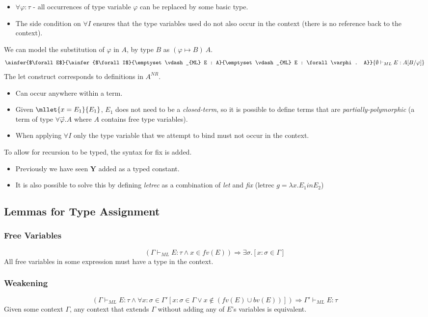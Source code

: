 \begin{itemize}
	\item $\forall \varphi : \tau$ - all occurrences of type variable $\varphi$ can be replaced by some basic type.
	\item The side condition on $\forall I$ ensures that the type variables used do not also occur in the context (there is no reference back to the context).
\end{itemize}
We can model the substitution of $\varphi$ in $A$, by type $B$ as $(\varphi \mapsto B) \ A$.
\[\ainfer{$\forall E$}{\ainfer{$\forall I$}{\emptyset \vdash_{ML} E : A}{\emptyset \vdash_{ML} E : \forall \varphi . A}}{\emptyset \vdash_{ML} E : A [B/\varphi]}\]
The let construct corresponds to definitions in $A^{NR}$.
\begin{itemize}
	\item Can occur anywhere within a term.
	\item Given $\mllet{x = E_1}{E_1}$, $E_1$ does not need to be a \textit{closed-term}, so it is possible to define terms that are \textit{partially-polymorphic} (a term of type $\forall \overset{\rightharpoonup}{\varphi} . A$ where $A$ contains free type variables).
	\item When applying $\forall I$ only the type variable that we attempt to bind must not occur in the context.
\end{itemize}
To allow for recursion to be typed, the syntax for fix is added.
\begin{itemize}
	\item Previously we have seen $\mathbf{Y}$ added as a typed constant.
	\item It is also possible to solve this by defining \textit{letrec} as a combination of \textit{let} and \textit{fix} ($\text{letrec } g = \lambda x . E_1 in E_2$)
\end{itemize}
\subsection{Lemmas for Type Assignment}
\subsubsection{Free Variables}
\[(\Gamma \vdash_{ML} E : \tau \land x \in fv(E)) \Rightarrow \exists \sigma . [x: \sigma \in \Gamma]\]
All free variables in some expression must have a type in the context.
\subsubsection{Weakening}
\[(\Gamma \vdash_{ML} E : \tau \land \forall x:\sigma \in \Gamma' [x:\sigma \in \Gamma \lor x \not\in (fv(E) \cup bv(E)) ]) \Rightarrow \Gamma' \vdash_{ML} E : \tau\]
Given some context $\Gamma$, any context that extends $\Gamma$ without adding any of $E$'s variables is equivalent.
